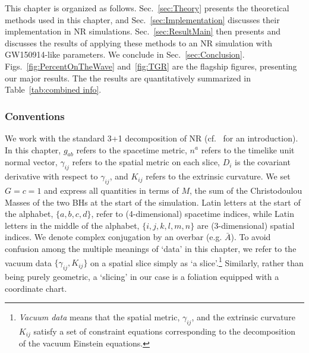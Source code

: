This chapter is organized as follows. Sec.~\ref{sec:Theory} presents the theoretical methods used in this chapter, and Sec.~\ref{sec:Implementation} discusses their implementation in NR simulations. Sec.~\ref{sec:ResultMain} then presents and discusses the results of applying these methods to an NR simulation with GW150914-like parameters. We conclude in Sec.~\ref{sec:Conclusion}. Figs.~\ref{fig:PercentOnTheWave} and~\ref{fig:TGR} are the flagship figures, presenting our major results. The the results are quantitatively summarized in Table~\ref{tab:combined info}.

\subsubsection*{Conventions}
We work with the standard 3+1 decomposition of NR (cf.~\cite{baumgarteShapiroBook} for an introduction). In this chapter, $g_{ab}$ refers to the spacetime metric, $n^a$ refers to the timelike unit normal vector, $\gamma_{ij}$ refers to the spatial metric on each slice, $D_i$ is the covariant derivative with respect to $\gamma_{ij}$, and $K_{ij}$ refers to the extrinsic curvature. We set $G = c = 1$ and express all quantities in terms of $M$, the sum of the Christodoulou Masses of the two BHs at the start of the simulation. Latin letters at the start of the alphabet, $\{a, b, c, d\}$, refer to (4-dimensional) spacetime indices, while Latin letters in the middle of the alphabet, $\{i,j,k,l,m,n\}$ are (3-dimensional) spatial indices. We denote complex conjugation by an overbar (e.g. $\bar{A}$). To avoid confusion among the multiple meanings of `data' in this chapter, we refer to the vacuum data $\{\gamma_{ij}, K_{ij}\}$ on a spatial slice simply as `a slice'.\footnote{\textit{Vacuum data} means that the spatial metric, $\gamma_{ij}$, and the extrinsic curvature $K_{ij}$ satisfy a set of constraint equations corresponding to the decomposition of the vacuum Einstein equations.} Similarly, rather than being purely geometric, a `slicing' in our case is a foliation equipped with a coordinate chart.






